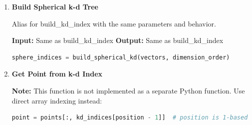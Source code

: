 \begin{enumerate}
\begin{enumerate}
\begin{itemize}
                    \item \texttt{dimension\_order numpy.ndarray}: Dimension ordering (1-based
                          Fortran indices, optional)
                  \end{itemize}
                  \textbf{Output:}
                  \begin{itemize}
                    \item \texttt{np.array}: Permutation indices (1-based Python indices)
                  \end{itemize}
                  \begin{lstlisting}[language=Python]
kd_indices = build_kd_index(points, dimension_order)
                  \end{lstlisting}
                  
            \item \textbf{Build Spherical k-d Tree}
                  
                  Alias for build\_kd\_index with the same parameters and behavior.
                  
                  \textbf{Input:} Same as build\_kd\_index \textbf{Output:} Same as build\_kd\_index
                  \begin{lstlisting}[language=Python]
sphere_indices = build_spherical_kd(vectors, dimension_order)
                  \end{lstlisting}
                  
            \item \textbf{Get Point from k-d Index}
                  
                  \textbf{Note:} This function is not implemented as a separate Python
                  function. Use direct array indexing instead:
                  \begin{lstlisting}[language=Python]
point = points[:, kd_indices[position - 1]]  # position is 1-based
                  \end{lstlisting}
          \end{enumerate}
\end{enumerate}